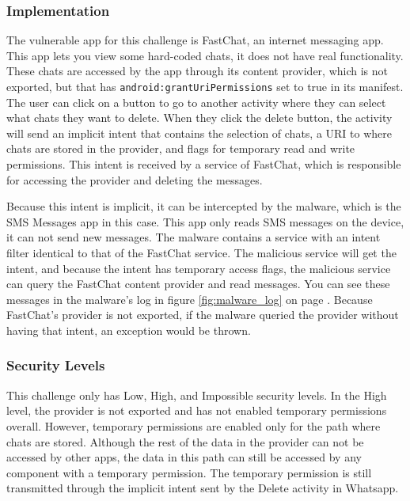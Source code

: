     \subsubsection{Implementation}
        \label{subsubsec:provider_uri_hijack_implementation}
        
    The vulnerable app for this challenge is FastChat, an internet messaging app. This app lets you view some hard-coded chats, it does not have real functionality. These chats are accessed by the app through its content provider, which is not exported, but that has \lstinline|android:grantUriPermissions| set to true in its manifest. The user can click on a button to go to another activity where they can select what chats they want to delete. When they click the delete button, the activity will send an implicit intent that contains the selection of chats, a URI to where chats are stored in the provider, and flags for temporary read and write permissions. This intent is received by a service of FastChat, which is responsible for accessing the provider and deleting the messages.
    
    Because this intent is implicit, it can be intercepted by the malware, which is the SMS Messages app in this case. This app only reads SMS messages on the device, it can not send new messages. The malware contains a service with an intent filter identical to that of the FastChat service. The malicious service will get the intent, and because the intent has temporary access flags, the malicious service can query the FastChat content provider and read messages. You can see these messages in the malware's log in figure \ref{fig:malware_log} on page \pageref{fig:malware_log}. Because FastChat's provider is not exported, if the malware queried the provider without having that intent, an exception would be thrown.
    
    \subsubsection{Security Levels}
        \label{subsubsec:provider_uri_hijack_security_levels}
        
    This challenge only has Low, High, and Impossible security levels. In the High level, the provider is not exported and has not enabled temporary permissions overall. However, temporary permissions are enabled only for the path where chats are stored. Although the rest of the data in the provider can not be accessed by other apps, the data in this path can still be accessed by any component with a temporary permission. The temporary permission is still transmitted through the implicit intent sent by the Delete activity in Whatsapp.
    
